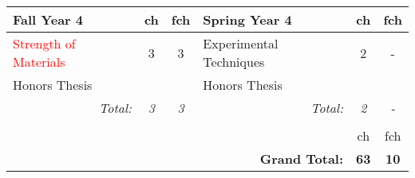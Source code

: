 \documentclass[12pt,preprint]{aastex}
\newcommand{\red}[1]{\textcolor{red}{#1}}
\begin{document}
\begin{longtable}{lcclcc}
\hline
{\bf Fall Year 4} & {\sc ch} & {\sc fch} & {\bf Spring Year 4} & {\sc ch} & {\sc fch} \\ 
\hline
\hline
\red{Strength of Materials} & 3 & 3 & Experimental Techniques & 2 & - \\
Honors Thesis               &   &   & Honors Thesis           &  &  \\
\multicolumn{1}{r}{\emph{Total:}} & \emph{3} & \emph{3} &
\multicolumn{1}{r}{\emph{Total:}} & \emph{2} & \emph{-} \\
\hline \\
 &   &   &  & {\sc ch} & {\sc fch} \\  
 &   &   & \multicolumn{1}{r}{{\bf Grand Total:}} & {\bf 63} & {\bf 10} \\  
\end{longtable}
\end{document}
